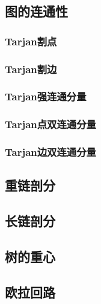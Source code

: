 \subsection{图的连通性}
\subsubsection{Tarjan割点}


\subsubsection{Tarjan割边}


\subsubsection{Tarjan强连通分量}


\subsubsection{Tarjan点双连通分量}


\subsubsection{Tarjan边双连通分量}


\subsection{重链剖分}


\subsection{长链剖分}

\subsection{树的重心}


\subsection{欧拉回路}

